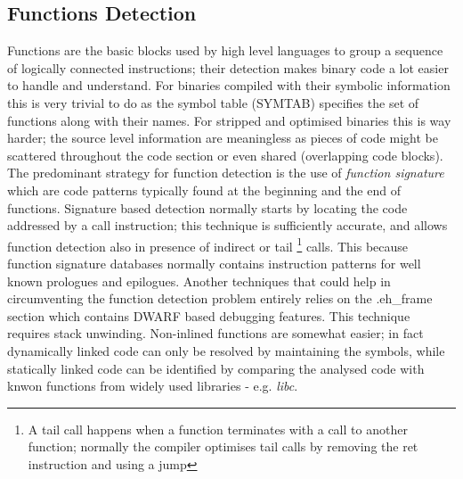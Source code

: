 \subsection{Functions Detection}
Functions are the basic blocks used by high level languages to group a sequence of logically connected instructions;
their detection makes binary code a lot easier to handle and understand. For binaries compiled with their symbolic
information this is very trivial to do as the symbol table ({\ttfamily SYMTAB}) specifies the set of functions along
with their names. For stripped and optimised binaries this is way harder; the source level information are meaningless
as pieces of code might be scattered throughout the code section or even shared (overlapping code blocks). The
predominant strategy for function detection is the use of \textit{function signature} which are code patterns typically
found at the beginning and the end of functions. Signature based detection normally starts by locating the code
addressed by a {\ttfamily call} instruction; this technique is sufficiently accurate, and allows function detection also
in presence of indirect or tail \footnote{A tail call happens when a function terminates with a call to another
function; normally the compiler optimises tail calls by removing the ret instruction and using a jump} calls. This
because function signature databases normally contains instruction patterns for well known prologues and epilogues.
Another techniques that could help in circumventing the function detection problem entirely relies on the
{\ttfamily .eh\_frame} section which contains DWARF based debugging features. This technique requires stack unwinding.
Non-inlined functions are somewhat easier; in fact dynamically linked code can only be resolved by maintaining the
symbols, while statically linked code can be identified by comparing the analysed code with knwon functions from widely
used libraries - e.g. \textit{libc}.

